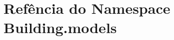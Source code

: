 \hypertarget{namespaceBuilding_1_1models}{\section{Refência do Namespace Building.\-models}
\label{namespaceBuilding_1_1models}
}
